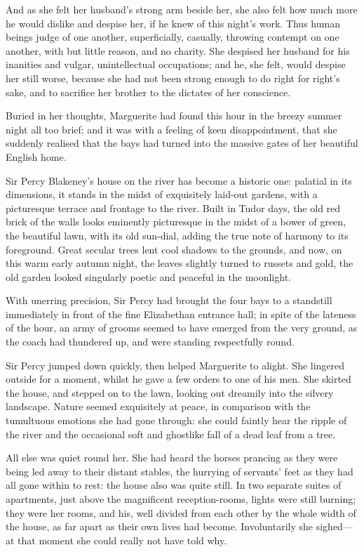 \documentclass[paper=5.5in:8.5in,BCOR=7mm,twoside,DIV=calc,12pt,usegeometry,chapterprefix,endperiod,headings=big]{scrbook}
\begin{document}
And as she felt her husband's strong arm beside her, she also felt how much more he would dislike and despise her, if he knew of this night's work. Thus human beings judge of one another, superficially, casually, throwing contempt on one another, with but little reason, and no charity. She despised her husband for his inanities and vulgar, unintellectual occupations; and he, she felt, would despise her still worse, because she had not been strong enough to do right for right's sake, and to sacrifice her brother to the dictates of her conscience.

Buried in her thoughts, Marguerite had found this hour in the breezy summer night all too brief; and it was with a feeling of keen disappointment, that she suddenly realised that the bays had turned into the massive gates of her beautiful English home.

Sir Percy Blakeney's house on the river has become a historic one: palatial in its dimensions, it stands in the midst of exquisitely laid-out gardens, with a picturesque terrace and frontage to the river. Built in Tudor days, the old red brick of the walls looks eminently picturesque in the midst of a bower of green, the beautiful lawn, with its old sun-dial, adding the true note of harmony to its foreground. Great secular trees lent cool shadows to the grounds, and now, on this warm early autumn night, the leaves slightly turned to russets and gold, the old garden looked singularly poetic and peaceful in the moonlight.

With unerring precision, Sir Percy had brought the four bays to a standstill immediately in front of the fine Elizabethan entrance hall; in spite of the lateness of the hour, an army of grooms seemed to have emerged from the very ground, as the coach had thundered up, and were standing respectfully round.

Sir Percy jumped down quickly, then helped Marguerite to alight. She lingered outside for a moment, whilst he gave a few orders to one of his men. She skirted the house, and stepped on to the lawn, looking out dreamily into the silvery landscape. Nature seemed exquisitely at peace, in comparison with the tumultuous emotions she had gone through: she could faintly hear the ripple of the river and the occasional soft and ghostlike fall of a dead leaf from a tree.

All else was quiet round her. She had heard the horses prancing as they were being led away to their distant stables, the hurrying of servants’ feet as they had all gone within to rest: the house also was quite still. In two separate suites of apartments, just above the magnificent reception-rooms, lights were still burning; they were her rooms, and his, well divided from each other by the whole width of the house, as far apart as their own lives had become. Involuntarily she sighed---at that moment she could really not have told why.
\end{document}
